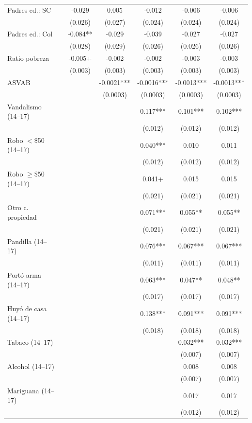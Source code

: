 \documentclass[11pt]{article}
\begin{document}
\begin{table}[H]
\begin{tabular}{lcccccc}
Padres ed.: SC &  & -0.029 & 0.005 & -0.012 & -0.006 & -0.006 \\
 &  & (0.026) & (0.027) & (0.024) & (0.024) & (0.024) \\
Padres ed.: Col &  & -0.084** & -0.029 & -0.039 & -0.027 & -0.027 \\
 &  & (0.028) & (0.029) & (0.026) & (0.026) & (0.026) \\
Ratio pobreza &  & -0.005+ & -0.002 & -0.002 & -0.003 & -0.003 \\
 &  & (0.003) & (0.003) & (0.003) & (0.003) & (0.003) \\
ASVAB &  &  & -0.0021*** & -0.0016*** & -0.0013*** & -0.0013*** \\
 &  &  & (0.0003) & (0.0003) & (0.0003) & (0.0003) \\
Vandalismo (14--17) &  &  &  & 0.117*** & 0.101*** & 0.102*** \\
 &  &  &  & (0.012) & (0.012) & (0.012) \\
Robo $<$\$50 (14--17) &  &  &  & 0.040*** & 0.010 & 0.011 \\
 &  &  &  & (0.012) & (0.012) & (0.012) \\
Robo $\geq$\$50 (14--17) &  &  &  & 0.041+ & 0.015 & 0.015 \\
 &  &  &  & (0.021) & (0.021) & (0.021) \\
Otro c. propiedad &  &  &  & 0.071*** & 0.055** & 0.055** \\
 &  &  &  & (0.021) & (0.021) & (0.021) \\
Pandilla (14--17) &  &  &  & 0.076*** & 0.067*** & 0.067*** \\
 &  &  &  & (0.011) & (0.011) & (0.011) \\
Portó arma (14--17) &  &  &  & 0.063*** & 0.047** & 0.048** \\
 &  &  &  & (0.017) & (0.017) & (0.017) \\
Huyó de casa (14--17) &  &  &  & 0.138*** & 0.091*** & 0.091*** \\
 &  &  &  & (0.018) & (0.018) & (0.018) \\
Tabaco (14--17) &  &  &  &  & 0.032*** & 0.032*** \\
 &  &  &  &  & (0.007) & (0.007) \\
Alcohol (14--17) &  &  &  &  & 0.008 & 0.008 \\
 &  &  &  &  & (0.007) & (0.007) \\
Mariguana (14--17) &  &  &  &  & 0.017 & 0.017 \\
 &  &  &  &  & (0.012) & (0.012) \\

\end{tabular}
\end{table}
\end{document}
